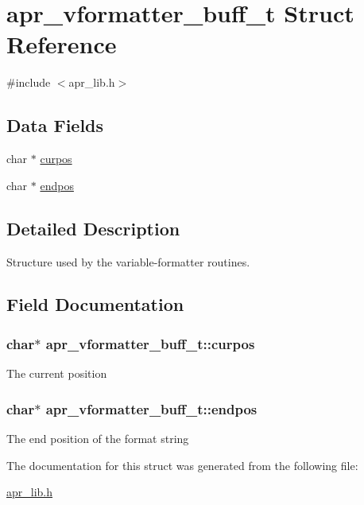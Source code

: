 \hypertarget{structapr__vformatter__buff__t}{\section{apr\-\_\-vformatter\-\_\-buff\-\_\-t Struct Reference}
\label{structapr__vformatter__buff__t}
}


{\ttfamily \#include $<$apr\-\_\-lib.\-h$>$}

\subsection*{Data Fields}
\begin{DoxyCompactItemize}
\item 
char $\ast$ \hyperlink{structapr__vformatter__buff__t_aad69bb2ce382b39f55df6cc59039aee9}{curpos}
\item 
char $\ast$ \hyperlink{structapr__vformatter__buff__t_ab4884e759f4285c72df93e0d63022675}{endpos}
\end{DoxyCompactItemize}


\subsection{Detailed Description}
Structure used by the variable-\/formatter routines. 

\subsection{Field Documentation}
\hypertarget{structapr__vformatter__buff__t_aad69bb2ce382b39f55df6cc59039aee9}{
\subsubsection[{curpos}]{\setlength{\rightskip}{0pt plus 5cm}char$\ast$ apr\-\_\-vformatter\-\_\-buff\-\_\-t\-::curpos}}\label{structapr__vformatter__buff__t_aad69bb2ce382b39f55df6cc59039aee9}
The current position \hypertarget{structapr__vformatter__buff__t_ab4884e759f4285c72df93e0d63022675}{
\subsubsection[{endpos}]{\setlength{\rightskip}{0pt plus 5cm}char$\ast$ apr\-\_\-vformatter\-\_\-buff\-\_\-t\-::endpos}}\label{structapr__vformatter__buff__t_ab4884e759f4285c72df93e0d63022675}
The end position of the format string 

The documentation for this struct was generated from the following file\-:\begin{DoxyCompactItemize}
\item 
\hyperlink{apr__lib_8h}{apr\-\_\-lib.\-h}\end{DoxyCompactItemize}
